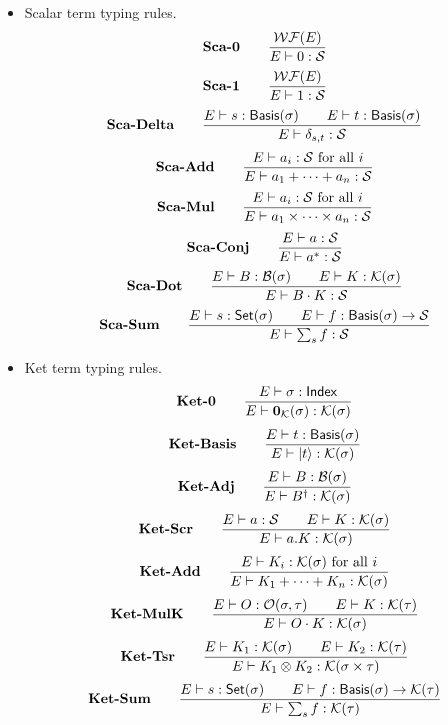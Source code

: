\begin{itemize}
    \item Scalar term typing rules.
    \[
        \textbf{Sca-0} \qquad
        \frac{\mathcal{WF}(E)}{E \vdash 0 : \mathcal{S}}
    \]
    \[
        \textbf{Sca-1} \qquad
        \frac{\mathcal{WF}(E)}{E \vdash 1 : \mathcal{S}}
    \]
    \[
        \textbf{Sca-Delta} \qquad
        \frac{ E\vdash s : \mathsf{Basis}(\sigma) \qquad E\vdash t : \mathsf{Basis}(\sigma) } {E \vdash \delta_{s, t} : \mathcal{S}}
    \]
    \[
        \textbf{Sca-Add} \qquad
        \frac{E\vdash a_i : \mathcal{S} \text{ for all $i$}}{E\vdash a_1 + \cdots + a_n : \mathcal{S}}
    \]
    \[
        \textbf{Sca-Mul} \qquad
        \frac{E\vdash a_i : \mathcal{S} \text{ for all $i$}}{E\vdash a_1 \times \cdots \times a_n : \mathcal{S}}
    \]
    \[
        \textbf{Sca-Conj} \qquad
        \frac{E \vdash a : \mathcal{S}}{E \vdash a^*:\mathcal{S}}
    \]
    \[
        \textbf{Sca-Dot} \qquad
        \frac{E\vdash B : \mathcal{B}(\sigma) \qquad E\vdash K : \mathcal{K}(\sigma)}{E \vdash B \cdot K : \mathcal{S}}
    \]
    \[
        \textbf{Sca-Sum} \qquad
        \frac{E \vdash s : \mathsf{Set}(\sigma) \qquad E \vdash f : \mathsf{Basis}(\sigma) \to \mathcal{S}}{E \vdash \sum_{s} f : \mathcal{S}}
    \]

    \item Ket term typing rules.
    \[
        \textbf{Ket-0} \qquad
        \frac{E \vdash \sigma : \mathsf{Index}}{E \vdash \mathbf{0}_\mathcal{K}(\sigma) : \mathcal{K}(\sigma)}
    \]
    \[
        \textbf{Ket-Basis} \qquad
        \frac{E\vdash t : \mathsf{Basis}(\sigma)}{E \vdash \ket{t} : \mathcal{K}(\sigma)}
    \]
    \[
        \textbf{Ket-Adj} \qquad
        \frac{E \vdash B : \mathcal{B}(\sigma)}{E \vdash B^\dagger : \mathcal{K}(\sigma)}
    \]
    \[
        \textbf{Ket-Scr} \qquad
        \frac{E \vdash a : \mathcal{S} \qquad E \vdash K : \mathcal{K}(\sigma)}{E \vdash a.K : \mathcal{K}(\sigma)}
    \]
    \[
        \textbf{Ket-Add} \qquad
        \frac{E \vdash K_i : \mathcal{K}(\sigma) \text{ for all $i$}}{E \vdash K_1 + \cdots + K_n : \mathcal{K}(\sigma)}
    \]
    \[
        \textbf{Ket-MulK} \qquad
        \frac{E \vdash O : \mathcal{O}(\sigma, \tau) \qquad E \vdash K : \mathcal{K}(\tau)}{E \vdash O \cdot K : \mathcal{K}(\sigma)}
    \]
    \[
        \textbf{Ket-Tsr} \qquad
        \frac{E \vdash K_1 : \mathcal{K}(\sigma) \qquad E \vdash K_2 : \mathcal{K}(\tau)} {E \vdash K_1 \otimes K_2 : \mathcal{K}(\sigma \times \tau)}
    \]
    \[
        \textbf{Ket-Sum} \qquad
        \frac{E \vdash s : \mathsf{Set}(\sigma) \qquad E \vdash f : \mathsf{Basis}(\sigma) \to \mathcal{K}(\tau)}{E \vdash \sum_{s} f : \mathcal{K}(\tau)}
    \]


\end{itemize}
